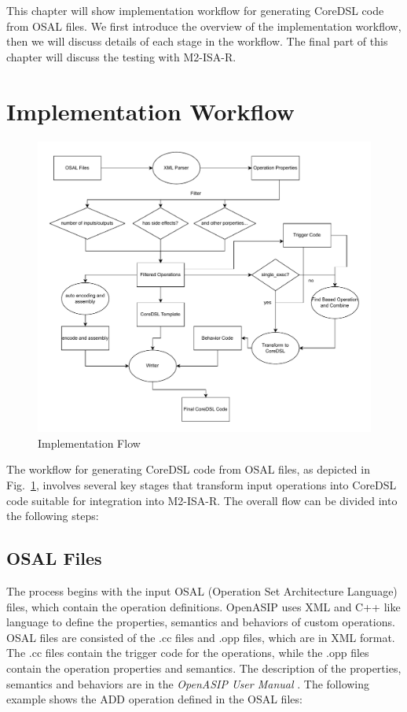 This chapter will show implementation workflow for generating CoreDSL code from OSAL files. We first introduce the overview of the implementation workflow, then we will discuss details of each stage in the workflow. The final part of this chapter will discuss the testing with M2-ISA-R.

\section{Implementation Workflow}

\begin{figure}[ht]
  \centering
  \includegraphics[width=\linewidth]{figures/flow.pdf}
  \caption{Implementation Flow}
  \label{fig:flow}
\end{figure}

The workflow for generating CoreDSL code from OSAL files, as depicted in Fig.~\ref{fig:flow}, involves several key stages that transform input operations into CoreDSL code suitable for integration into M2-ISA-R. The overall flow can be divided into the following steps:

\subsection{OSAL Files}
The process begins with the input OSAL (Operation Set Architecture Language) files, which contain the operation definitions. OpenASIP uses XML and C++ like language to define the properties, semantics and behaviors of custom operations. OSAL files are consisted of the .cc files and .opp files, which are in XML format. The .cc files contain the trigger code for the operations, while the .opp files contain the operation properties and semantics. The description of the properties, semantics and behaviors are in the \textit{OpenASIP User Manual} \cite{openasipmanual}. The following example shows the ADD operation defined in the OSAL files:


